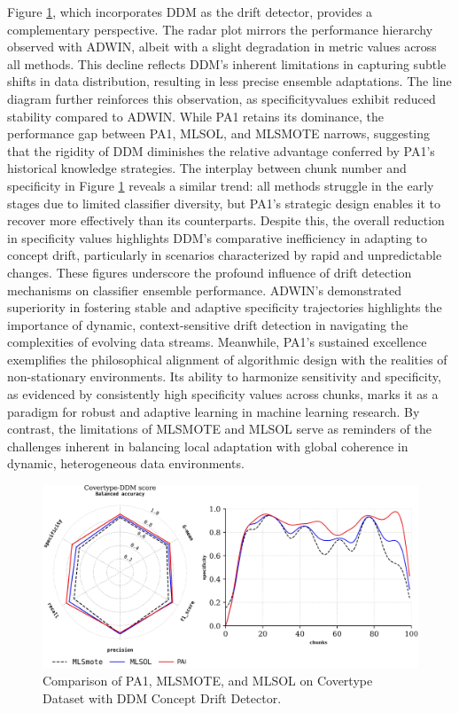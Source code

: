 Figure \ref{fig:4_first_proposal_result_exp_2}, which incorporates DDM as the drift detector, provides a complementary perspective. The radar plot mirrors the performance hierarchy observed with ADWIN, albeit with a slight degradation in metric values across all methods. This decline reflects DDM’s inherent limitations in capturing subtle shifts in data distribution, resulting in less precise ensemble adaptations. The line diagram further reinforces this observation, as specificityvalues exhibit reduced stability compared to ADWIN. While PA1 retains its dominance, the performance gap between PA1, MLSOL, and MLSMOTE narrows, suggesting that the rigidity of DDM diminishes the relative advantage conferred by PA1’s historical knowledge strategies. The interplay between chunk number and specificity in Figure \ref{fig:4_first_proposal_result_exp_2} reveals a similar trend: all methods struggle in the early stages due to limited classifier diversity, but PA1’s strategic design enables it to recover more effectively than its counterparts. Despite this, the overall reduction in specificity values highlights DDM’s comparative inefficiency in adapting to concept drift, particularly in scenarios characterized by rapid and unpredictable changes.
These figures underscore the profound influence of drift detection mechanisms on classifier ensemble performance. ADWIN’s demonstrated superiority in fostering stable and adaptive specificity trajectories highlights the importance of dynamic, context-sensitive drift detection in navigating the complexities of evolving data streams. Meanwhile, PA1’s sustained excellence exemplifies the philosophical alignment of algorithmic design with the realities of non-stationary environments. Its ability to harmonize sensitivity and specificity, as evidenced by consistently high specificity values across chunks, marks it as a paradigm for robust and adaptive learning in machine learning research. By contrast, the limitations of MLSMOTE and MLSOL serve as reminders of the challenges inherent in balancing local adaptation with global coherence in dynamic, heterogeneous data environments.

\vspace{-2mm}
\begin{figure}[H]
	\centering
	\includegraphics[width=1\linewidth]{4_Imbalanced/figures/exp_2.png}
  \caption{Comparison of PA1, MLSMOTE, and MLSOL on Covertype Dataset with DDM Concept Drift Detector.}
	\label{fig:4_first_proposal_result_exp_2}
\end{figure}

